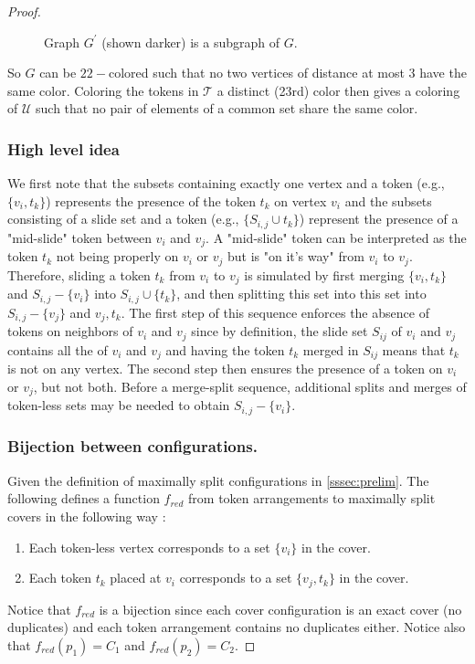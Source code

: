 \begin{proof}
\begin{figure} [H]
\begin{tikzpicture}
  \end{tikzpicture}
  \caption{Graph $G^{'}$ (shown darker) is a subgraph of $G$.}
  \label{fig:subgraph}
\end{figure}


So $G$ can be $22-$colored such that no two vertices of distance at most $3$ have the same color. Coloring the tokens in $\mathcal{T}$
a distinct (23rd) color then gives a coloring of $\mathcal{U}$ such that no pair of elements of a common set share the same color.

\subsubsection{High level idea}\label{subsubsection:high_level}
We first note that the subsets containing exactly one vertex and a token (e.g., $\{v_i, t_k\}$) represents the presence of the token
$t_k$ on vertex $v_i$ and the subsets consisting of a slide set and a token (e.g., $\{S_{i,j} \cup t_k\}$) represent the presence of a
"mid-slide" token between $v_i$ and $v_j$. A "mid-slide" token can be interpreted as the token $t_k$ not being properly on $v_i$ or $v_j$ but is
"on it's way" from $v_i$ to $v_j$. Therefore, sliding a token $t_k$ from $v_i$ to $v_j$ is simulated by first
merging $\{v_i, t_k\}$ and $S_{i,j}-\{v_i\}$ into $S_{i,j} \cup \{t_k\}$, and then splitting this set into this set into $S_{i,j}-\{v_j\}$
and ${v_j, t_k}$. The first step of this sequence enforces the absence of tokens on neighbors of $v_i$ and $v_j$ since by definition, the slide
set $S_{ij}$ of $v_i$ and $v_j$ contains all the of $v_i$ and $v_j$ and having the token $t_k$  merged in $S_{ij}$ means that $t_k$ is not on any
vertex. The second step then ensures the presence of a token on $v_i$ or $v_j$, but not both.
Before a merge-split sequence, additional splits and merges of token-less sets may be needed to obtain $S_{i,j}-\{v_i\}$.

\subsubsection{Bijection between configurations.}
Given the definition of maximally split configurations in \ref{sssec:prelim}. The following defines a function $f_{red}$ from token arrangements
to maximally split covers in the following way :
\begin{enumerate}
  \item Each token-less vertex corresponds to a set $\{v_i\}$ in the cover.
  \item Each token $t_k$ placed at $v_i$ corresponds to a set $\{v_j, t_k\}$ in the cover.
\end{enumerate}
Notice that $f_{red}$ is a bijection since each cover configuration is an exact cover (no duplicates) and each token
arrangement contains no duplicates either. Notice also that $f_{red}(p_1) = C_1$ and $f_{red}(p_2) = C_2$.



\end{proof}
